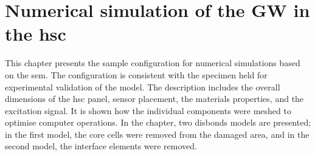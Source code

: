 
\chapter[Numerical simulation of the GW in the \ac{hsc}]{Numerical simulation of the GW in the \ac{hsc}}
\label{ch:simulation}

This chapter presents the sample configuration for numerical simulations based on the \ac{sem}.
The configuration is consistent with the specimen held for experimental validation of the model.
The description includes the overall dimensions of the \ac{hsc} panel, sensor placement, the materials properties, and the excitation signal.
It is shown how the individual components were meshed to optimise computer operations.
In the chapter, two disbonds models are presented; in the first model, the core cells were removed from the damaged area, and in the second model, the interface elements were removed.








